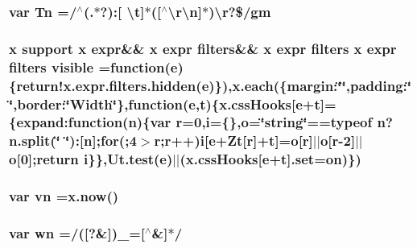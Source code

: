 \hypertarget{jquery-1_810_82_8min_8js_a2a743fa90b7bc233019c5b720ccde5cc}{
\subsubsection[{Tn}]{\setlength{\rightskip}{0pt plus 5cm}var Tn =/$^\wedge$(.$\ast$?)\-:\mbox{[} \textbackslash{}{\bf t}\mbox{]}$\ast$(\mbox{[}$^\wedge$\textbackslash{}r\textbackslash{}n\mbox{]}$\ast$)\textbackslash{}r?\$/gm}}\label{jquery-1_810_82_8min_8js_a2a743fa90b7bc233019c5b720ccde5cc}
\hypertarget{jquery-1_810_82_8min_8js_a52992524aa1f4d01d5c9f1b9a15c35f5}{
\subsubsection[{visible}]{ {\bf x} {\bf support} {\bf x} {\bf expr}\&\& {\bf x} {\bf expr} filters\&\& {\bf x} {\bf expr} filters {\bf x} {\bf expr} filters visible =function({\bf e})\{{\bf return!x.\-expr.\-filters.\-hidden}({\bf e})\}),{\bf x.\-each}(\{margin\-:\char`\"{}\char`\"{},padding\-:\char`\"{}\char`\"{},border\-:\char`\"{}Width\char`\"{}\},function({\bf e},{\bf t})\{{\bf x.\-css\-Hooks}\mbox{[}{\bf e}+{\bf t}\mbox{]}=\{expand\-:function(n)\{var r=0,i=\{\},o=\char`\"{}string\char`\"{}==typeof n?n.\-split(\char`\"{} \char`\"{})\-:\mbox{[}n\mbox{]};for(;4$>$r;r++)i\mbox{[}{\bf e}+Zt\mbox{[}r\mbox{]}+{\bf t}\mbox{]}=o\mbox{[}r\mbox{]}$\vert$$\vert$o\mbox{[}r-\/2\mbox{]}$\vert$$\vert$o\mbox{[}0\mbox{]};return i\}\},Ut.\-test({\bf e})$\vert$$\vert$({\bf x.\-css\-Hooks}\mbox{[}{\bf e}+{\bf t}\mbox{]}.set={\bf on})\})}}\label{jquery-1_810_82_8min_8js_a52992524aa1f4d01d5c9f1b9a15c35f5}
\hypertarget{jquery-1_810_82_8min_8js_a4d3ea42bab8c1a36105c29b5a098a050}{
\subsubsection[{vn}]{\setlength{\rightskip}{0pt plus 5cm}var vn ={\bf x.\-now}()}}\label{jquery-1_810_82_8min_8js_a4d3ea42bab8c1a36105c29b5a098a050}
\hypertarget{jquery-1_810_82_8min_8js_aaa87ec69cc4d144180280e906cac73f1}{
\subsubsection[{wn}]{\setlength{\rightskip}{0pt plus 5cm}var wn =/(\mbox{[}?\&\mbox{]})\-\_\-=\mbox{[}$^\wedge$\&\mbox{]}$\ast$/}}\label{jquery-1_810_82_8min_8js_aaa87ec69cc4d144180280e906cac73f1}
